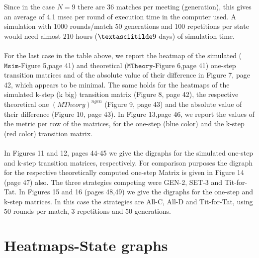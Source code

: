 \documentclass[12pt]{article}
\begin{document}
Since in the case $N=9$ there are 36 matches per meeting (generation), this gives an average of 4.1 msec per round of execution time in the computer used. A simulation with 1000 rounds/match 50 generations and 100 repetitions per state would need almost 210 hours ($\textasciitilde 9$ days) of simulation time.
\\\\
For the last case in the table above, we report the heatmap of the simulated ($\texttt{Msim}$-Figure 5,page 41) and theoretical ($\texttt{MTheory}$-Figure 6,page 41) one-step transition matrices and of the absolute value of their difference in Figure 7, page 42, which appears to be minimal. The same holds for the heatmaps of the simulated k-step (k big) transition matrix (Figure 8, page 42), the respective theoretical one $(MTheory)^{ngen}$ (Figure 9, page 43) and the absolute value of their difference (Figure 10, page 43). In Figure 13,page 46, we report the values of the metric per row of the matrices, for the one-step (blue color) and the k-step (red color) transition matrix.
\\\\
In Figures 11 and 12, pages 44-45 we give the digraphs for the simulated one-step and k-step transition matrices, respectively. For comparison purposes the digraph for the respective theoretically computed one-step Matrix is given in Figure 14  (page 47) also. The three strategies competing were GEN-2, SET-3 and Tit-for-Tat. In Figures 15 and 16 (pages 48,49) we give the digraphs for the one-step and k-step matrices. In this case the strategies are All-C, All-D and Tit-for-Tat, using 50 rounds per match, 3 repetitions and 50 generations.


\newpage
\section{Heatmaps-State graphs}
\end{document}

